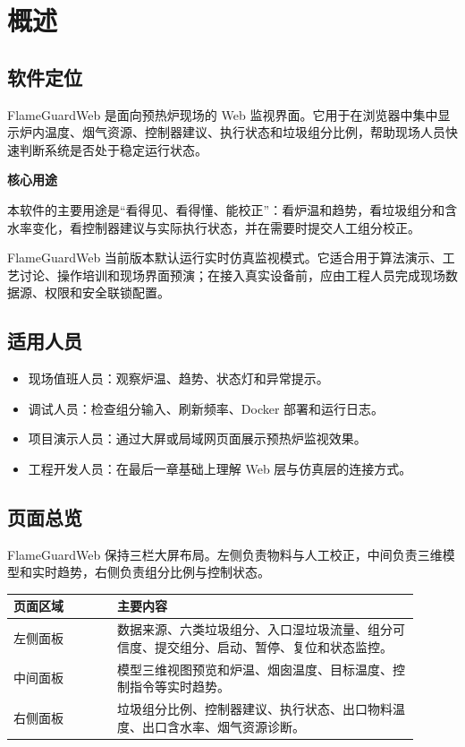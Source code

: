 \documentclass[UTF8,openany,zihao=-4,oneside]{ctexbook}
\newcommand{\notebox}[2]{\begin{tcolorbox}[enhanced,colback=FGBlue!4,colframe=FGBlue!45,boxrule=0.5pt,arc=1.5mm,left=4mm,right=4mm,top=3mm,bottom=3mm]\sffamily\textbf{\color{FGDeep}#1}\par\vspace{0.25em}\color{FGText}#2\end{tcolorbox}}
\begin{document}
\chapter{概述}

\section{软件定位}
FlameGuardWeb 是面向预热炉现场的 Web 监视界面。它用于在浏览器中集中显示炉内温度、烟气资源、控制器建议、执行状态和垃圾组分比例，帮助现场人员快速判断系统是否处于稳定运行状态。

\notebox{核心用途}{本软件的主要用途是“看得见、看得懂、能校正”：看炉温和趋势，看垃圾组分和含水率变化，看控制器建议与实际执行状态，并在需要时提交人工组分校正。}

FlameGuardWeb 当前版本默认运行实时仿真监视模式。它适合用于算法演示、工艺讨论、操作培训和现场界面预演；在接入真实设备前，应由工程人员完成现场数据源、权限和安全联锁配置。

\section{适用人员}
\begin{itemize}
  \item 现场值班人员：观察炉温、趋势、状态灯和异常提示。
  \item 调试人员：检查组分输入、刷新频率、Docker 部署和运行日志。
  \item 项目演示人员：通过大屏或局域网页面展示预热炉监视效果。
  \item 工程开发人员：在最后一章基础上理解 Web 层与仿真层的连接方式。
\end{itemize}

\section{页面总览}
FlameGuardWeb 保持三栏大屏布局。左侧负责物料与人工校正，中间负责三维模型和实时趋势，右侧负责组分比例与控制状态。

\begin{longtable}{p{0.23\linewidth}p{0.67\linewidth}}
\toprule
\textbf{页面区域} & \textbf{主要内容} \\
\midrule
左侧面板 & 数据来源、六类垃圾组分、入口湿垃圾流量、组分可信度、提交组分、启动、暂停、复位和状态监控。 \\
中间面板 & 模型三维视图预览和炉温、烟囱温度、目标温度、控制指令等实时趋势。 \\
右侧面板 & 垃圾组分比例、控制器建议、执行状态、出口物料温度、出口含水率、烟气资源诊断。 \\
\bottomrule
\end{longtable}
\end{document}
